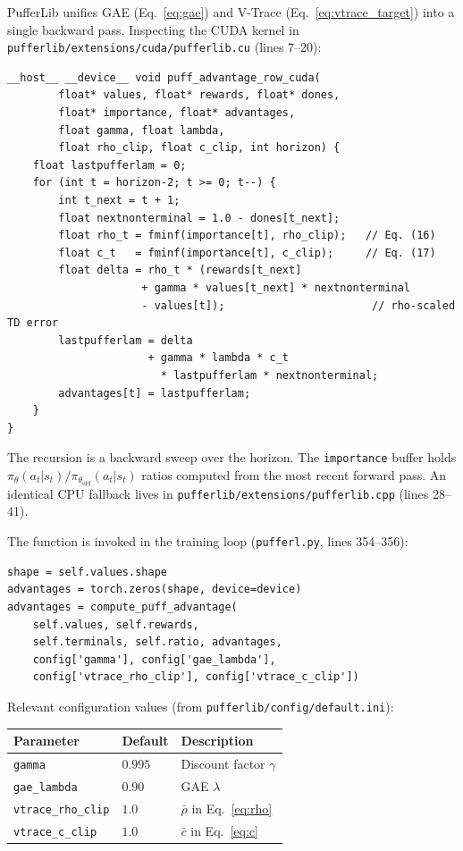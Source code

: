 \documentclass[12pt, a4paper]{article}
\theoremstyle{definition}
\theoremstyle{plain}
\theoremstyle{remark}
\begin{document}
PufferLib unifies GAE (Eq.~\ref{eq:gae}) and V-Trace (Eq.~\ref{eq:vtrace_target}) into
a single backward pass.  Inspecting the CUDA kernel in
\texttt{pufferlib/extensions/cuda/pufferlib.cu} (lines 7--20):

\begin{lstlisting}[style=cstyle,
  caption={Unified GAE + V-Trace advantage kernel (CUDA, \texttt{pufferlib/extensions/cuda/pufferlib.cu}, lines 7--20).}]
__host__ __device__ void puff_advantage_row_cuda(
        float* values, float* rewards, float* dones,
        float* importance, float* advantages,
        float gamma, float lambda,
        float rho_clip, float c_clip, int horizon) {
    float lastpufferlam = 0;
    for (int t = horizon-2; t >= 0; t--) {
        int t_next = t + 1;
        float nextnonterminal = 1.0 - dones[t_next];
        float rho_t = fminf(importance[t], rho_clip);   // Eq. (16)
        float c_t   = fminf(importance[t], c_clip);     // Eq. (17)
        float delta = rho_t * (rewards[t_next]
                     + gamma * values[t_next] * nextnonterminal
                     - values[t]);                       // rho-scaled TD error
        lastpufferlam = delta
                      + gamma * lambda * c_t
                        * lastpufferlam * nextnonterminal;
        advantages[t] = lastpufferlam;
    }
}
\end{lstlisting}

The recursion is a backward sweep over the horizon.  The \texttt{importance} buffer
holds $\pi_\theta(a_t|s_t)/\pi_{\theta_\mathrm{old}}(a_t|s_t)$ ratios computed from the
most recent forward pass.  An identical CPU fallback lives in
\texttt{pufferlib/extensions/pufferlib.cpp} (lines 28--41).

The function is invoked in the training loop (\texttt{pufferl.py}, lines 354--356):

\begin{lstlisting}[style=pythonstyle,
  caption={Advantage computation call in \texttt{pufferlib/pufferl.py} (lines 352--356).}]
shape = self.values.shape
advantages = torch.zeros(shape, device=device)
advantages = compute_puff_advantage(
    self.values, self.rewards,
    self.terminals, self.ratio, advantages,
    config['gamma'], config['gae_lambda'],
    config['vtrace_rho_clip'], config['vtrace_c_clip'])
\end{lstlisting}

Relevant configuration values (from \texttt{pufferlib/config/default.ini}):
\begin{center}
\begin{tabular}{lll}
  \toprule
  Parameter & Default & Description \\
  \midrule
  \texttt{gamma}          & $0.995$ & Discount factor $\gamma$ \\
  \texttt{gae\_lambda}    & $0.90$  & GAE $\lambda$ \\
  \texttt{vtrace\_rho\_clip} & $1.0$ & $\bar{\rho}$ in Eq.~\eqref{eq:rho} \\
  \texttt{vtrace\_c\_clip}   & $1.0$ & $\bar{c}$    in Eq.~\eqref{eq:c}  \\
  \bottomrule
\end{tabular}
\end{center}
\end{document}
